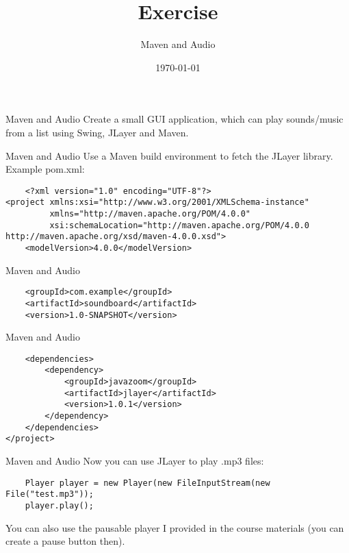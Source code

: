


\title{Exercise}
\subtitle{Maven and Audio}
\date{\today}




\begin{frame}
    \titlepage
\end{frame}

\begin{frame}[fragile]{Maven and Audio}
    Create a small GUI application, which can play sounds/music from a list using Swing, JLayer and Maven.
\end{frame}

\begin{frame}[fragile]{Maven and Audio}
    Use a Maven build environment to fetch the JLayer library. Example pom.xml:
    \begin{lstlisting}
    <?xml version="1.0" encoding="UTF-8"?>
<project xmlns:xsi="http://www.w3.org/2001/XMLSchema-instance"
         xmlns="http://maven.apache.org/POM/4.0.0"
         xsi:schemaLocation="http://maven.apache.org/POM/4.0.0 http://maven.apache.org/xsd/maven-4.0.0.xsd">
    <modelVersion>4.0.0</modelVersion>\end{lstlisting}
\end{frame}

\begin{frame}[fragile]{Maven and Audio}
    \begin{lstlisting}
    <groupId>com.example</groupId>
    <artifactId>soundboard</artifactId>
    <version>1.0-SNAPSHOT</version>\end{lstlisting}
\end{frame}

\begin{frame}[fragile]{Maven and Audio}
    \begin{lstlisting}
    <dependencies>
        <dependency>
            <groupId>javazoom</groupId>
            <artifactId>jlayer</artifactId>
            <version>1.0.1</version>
        </dependency>
    </dependencies>
</project>\end{lstlisting}
\end{frame}

\begin{frame}{Maven and Audio}
    Now you can use JLayer to play .mp3 files:
    \begin{lstlisting}
    Player player = new Player(new FileInputStream(new File("test.mp3"));
    player.play();\end{lstlisting}
    You can also use the pausable player I provided in the course materials (you can create a pause button then).
\end{frame}

